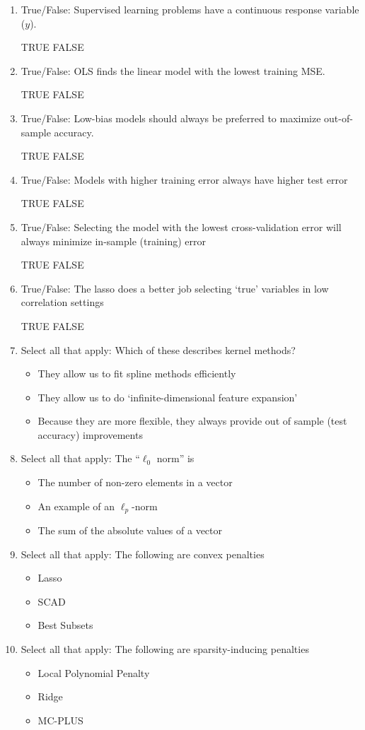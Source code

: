 \documentclass[12pt]{article}
\begin{document}
\begin{enumerate}[label={Q\arabic*.}]
\item True/False: Supervised learning problems have a continuous response variable ($y$).

\qquad TRUE \qquad \qquad FALSE
\item True/False: OLS finds the linear model with the lowest training MSE.

\qquad TRUE \qquad \qquad FALSE
\item True/False: Low-bias models should always be preferred to maximize out-of-sample accuracy.

\qquad TRUE \qquad \qquad FALSE
\item True/False: Models with higher training error always have higher test error

\qquad TRUE \qquad \qquad FALSE
\item True/False: Selecting the model with the lowest cross-validation error will always minimize in-sample (training) error

\qquad TRUE \qquad \qquad FALSE
\item True/False: The lasso does a better job selecting `true' variables in low correlation settings

\qquad TRUE \qquad \qquad FALSE
\item Select all that apply: Which of these describes kernel methods?
\begin{itemize}
    \item They allow us to fit spline methods efficiently
    \item They allow us to do `infinite-dimensional feature expansion'
    \item Because they are more flexible, they always provide out of sample (test accuracy) improvements
\end{itemize}
\item Select all that apply: The ``$\ell_0$ norm'' is
\begin{itemize}
    \item The number of non-zero elements in a vector
    \item An example of an $\ell_p$-norm
    \item The sum of the absolute values of a vector
\end{itemize}
\item Select all that apply: The following are convex penalties
\begin{itemize}
    \item Lasso
    \item SCAD
    \item Best Subsets
\end{itemize}
\item Select all that apply: The following are sparsity-inducing penalties
\begin{itemize}
    \item Local Polynomial Penalty
    \item Ridge 
    \item MC-PLUS
\end{itemize}
\end{enumerate}
\clearpage
\end{document}
